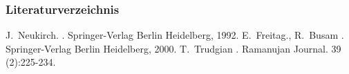 \begin{frame}
    \frametitle{Literaturverzeichnis}

    \begin{thebibliography}{Freitag und Busam, 2000}
            J.~Neukirch.
            .
            \newblock Springer-Verlag Berlin Heidelberg, 1992.
            E.~Freitag., R.~Busam
            .
            \newblock Springer-Verlag Berlin Heidelberg, 2000.
            T.~Trudgian
            .
            \newblock Ramanujan Journal. 39 (2):225-234.
    \end{thebibliography}

\end{frame}
